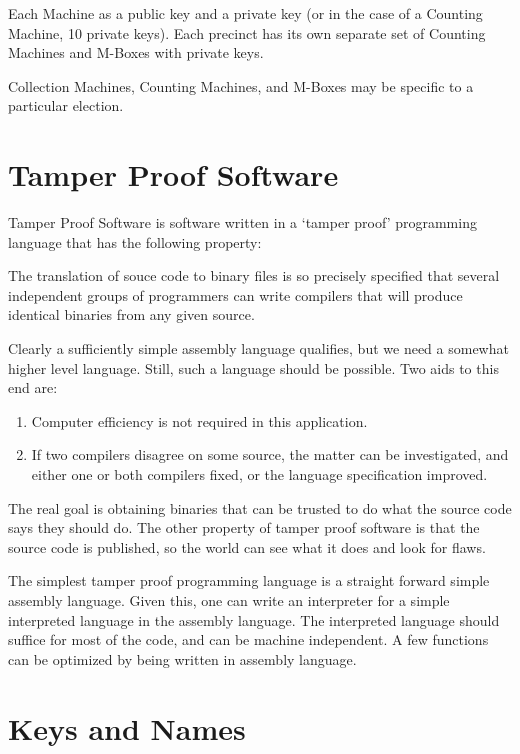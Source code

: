 \documentclass[12pt]{article}
\newenvironment{indpar}[1][0.3in]%
	{\begin{list}{}%
		     {\setlength{\itemsep}{0in}%
		      \setlength{\topsep}{0in}%
		      \setlength{\parsep}{1ex}%
		      \setlength{\labelwidth}{#1}%
		      \setlength{\leftmargin}{#1}%
		      \addtolength{\leftmargin}{\labelsep}}%
	 \item}%
	{\end{list}}
\begin{document}
Each Machine as a public key and a private key (or in the
case of a Counting Machine, 10 private keys).  Each precinct
has its own separate set of Counting Machines and M-Boxes with
private keys.

Collection Machines, Counting Machines, and M-Boxes may be
specific to a particular election.

\section{Tamper Proof Software}

Tamper Proof Software is software written in a `tamper proof'
programming language
that has the following property:
\begin{indpar}
The translation of souce code to binary files is so precisely
specified that several independent groups of programmers can
write compilers that will produce identical binaries from any
given source.
\end{indpar}

Clearly a sufficiently simple assembly language qualifies, but
we need a somewhat higher level language.  Still, such a language
should be possible.  Two aids to this end are:
\begin{enumerate}
\item
Computer efficiency is not required in this application.

\item
If two compilers disagree on some source, the matter can be
investigated, and either one or both compilers fixed, or the
language specification improved.
\end{enumerate}

The real goal is obtaining binaries that can be trusted to
do what the source code says they should do.  The other
property of tamper proof software is that the source code
is published, so the world can see what it does and look
for flaws.

The simplest tamper proof programming language is a straight
forward simple assembly language.  Given this, one can write
an interpreter for a simple interpreted language in the
assembly language.  The interpreted language should suffice
for most of the code, and can be machine independent.
A few functions can be optimized by being written in assembly
language.

\section{Keys and Names}
\end{document}
